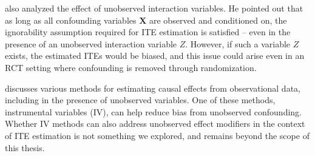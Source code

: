 \citet{vegetabile2021} also analyzed the effect of unobserved interaction variables. He pointed out that as long as all confounding variables $\mathbf{X}$ are observed and conditioned on, the ignorability assumption required for ITE estimation is satisfied -- even in the presence of an unobserved interaction variable $Z$. However, if such a variable $Z$ exists, the estimated ITEs would be biased, and this issue could arise even in an RCT setting where confounding is removed through randomization.

\citet{nichols2007} discusses various methods for estimating causal effects from observational data, including in the presence of unobserved variables. One of these methods, instrumental variables (IV), can help reduce bias from unobserved confounding. Whether IV methods can also address unobserved effect modifiers in the context of ITE estimation is not something we explored, and remains beyond the scope of this thesis.


















